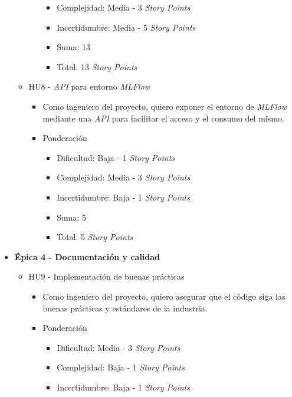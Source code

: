 \documentclass[
11pt, %
]{charter}
\begin{document}
\begin{itemize}
\begin{itemize}
\begin{itemize}
\begin{itemize}
                \item Complejidad: Media - 3 \textit{Story Points}
                \item Incertidumbre: Media - 5 \textit{Story Points}
                \item Suma: 13
                \item Total: 13 \textit{Story Points}
            \end{itemize}
        \end{itemize}
      \item HU8 - \textit{API} para entorno \textit{MLFlow}
        \begin{itemize}
            \item Como ingeniero del proyecto, quiero exponer el entorno de \textit{MLFlow} mediante una \textit{API} para facilitar el acceso y el consumo del mismo.
            \item Ponderación
            \begin{itemize}
                \item Dificultad: Baja - 1 \textit{Story Points}
                \item Complejidad: Media - 3 \textit{Story Points}
                \item Incertidumbre: Baja - 1 \textit{Story Points}
                \item Suma: 5
                \item Total: 5 \textit{Story Points}
            \end{itemize}
        \end{itemize}
    \end{itemize}
  \item \textbf{\'{E}pica 4 - Documentación y calidad}
    \begin{itemize}
      \item HU9 - Implementación de buenas prácticas
        \begin{itemize}
            \item Como ingeniero del proyecto, quiero asegurar que el código siga las buenas prácticas y estándares de la industria.
            \item Ponderación
            \begin{itemize}
                \item Dificultad: Media - 3 \textit{Story Points}
                \item Complejidad: Baja - 1 \textit{Story Points}
                \item Incertidumbre: Baja - 1 \textit{Story Points}

\end{itemize}
\end{itemize}
\end{itemize}
\end{itemize}
\end{document}
